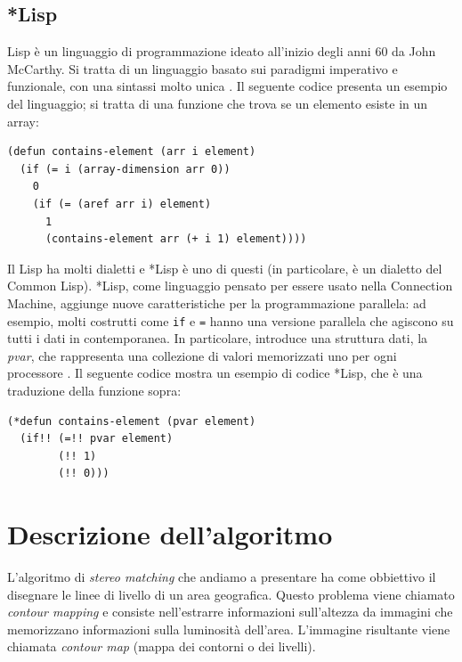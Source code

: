 \documentclass[12pt,a4paper,openright,twoside]{report}
\begin{document}
\section{*Lisp}

Lisp è un linguaggio di programmazione ideato all'inizio degli anni 60 da John McCarthy. Si tratta di un linguaggio basato sui paradigmi imperativo e funzionale, con una sintassi molto unica \cite{lispwp}. Il seguente codice presenta un esempio del linguaggio; si tratta di una funzione che trova se un elemento esiste in un array:

\newpage

\begin{lstlisting}[caption={Esempio di codice Lisp. Questa funzione implementa la ricerca nell'array in maniera ricorsiva, in concordanza con il paradigma funzionale.}]
(defun contains-element (arr i element)
  (if (= i (array-dimension arr 0))
    0
    (if (= (aref arr i) element)
      1
      (contains-element arr (+ i 1) element))))
\end{lstlisting}

Il Lisp ha molti dialetti e *Lisp è uno di questi (in particolare, è un dialetto del Common Lisp). *Lisp, come linguaggio pensato per essere usato nella Connection Machine, aggiunge nuove caratteristiche per la programmazione parallela: ad esempio, molti costrutti come \verb|if| e \verb|=| hanno una versione parallela che agiscono su tutti i dati in contemporanea. In particolare, introduce una struttura dati, la \textit{pvar}, che rappresenta una collezione di valori memorizzati uno per ogni processore \cite{starlisp}. Il seguente codice mostra un esempio di codice *Lisp, che è una traduzione della funzione sopra:

\begin{lstlisting}[caption={Esempio di codice *Lisp. Questa versione della funzione implementa la ricerca in parallelo su tutti gli elementi dell'array.}]
(*defun contains-element (pvar element)
  (if!! (=!! pvar element)
        (!! 1)
        (!! 0)))
\end{lstlisting}

\chapter{Descrizione dell'algoritmo}

L'algoritmo di \textit{stereo matching} che andiamo a presentare ha come obbiettivo il disegnare le linee di livello di un area geografica. Questo problema viene chiamato \textit{contour mapping} e consiste nell'estrarre informazioni sull'altezza da immagini che memorizzano informazioni sulla luminosità dell'area. L'immagine risultante viene chiamata \textit{contour map} (mappa dei contorni o dei livelli).
\end{document}
